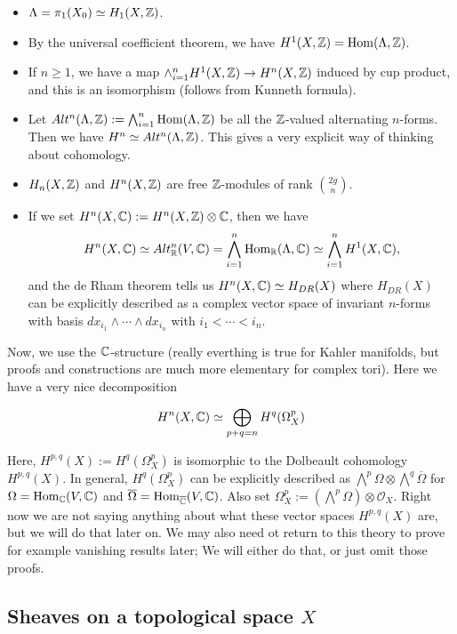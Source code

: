 \begin{itemize}
\item $\Lambda=\pi_1(X_0)\simeq H_1(X,{\mathbb Z})$.
\item By the universal coefficient theorem, we have $H^1(X,{\mathbb Z})=\operatorname{Hom}(\Lambda,{\mathbb Z})$.
\item If $n\geq 1$, we have a map $\wedge_{i=1}^n H^1(X,{\mathbb Z})\to H^n(X,{\mathbb Z})$ induced by cup product, and this is an isomorphism (follows from Kunneth formula). 
\item Let $Alt^n(\Lambda,{\mathbb Z}):=\bigwedge_{i=1}^n \operatorname{Hom}(\Lambda,{\mathbb Z})$ be all the ${\mathbb Z}$-valued alternating $n$-forms. Then we have $H^n\simeq Alt^n(\Lambda,{\mathbb Z})$. This gives a very explicit way of thinking about cohomology.
\item $H_n(X,{\mathbb Z})$ and $H^n(X,{\mathbb Z})$ are free ${\mathbb Z}$-modules of rank $\binom{2g}{n}$.
\item If we set $H^n(X,{\mathbb C}):= H^n(X,{\mathbb Z})\otimes {\mathbb C}$, then we have
$$H^n(X,{\mathbb C})\simeq Alt_{\mathbb R}^n(V,{\mathbb C})=\bigwedge_{i=1}^n\operatorname{Hom}_{\mathbb R}(\Lambda,{\mathbb C})\simeq \bigwedge_{i=1}^n H^1(X,{\mathbb C}),$$ 
and the de Rham theorem tells us 
$H^n(X,{\mathbb C})\simeq H_{DR}(X)$ where $H_{DR}(X)$ can be explicitly described as a complex vector space of invariant $n$-forms with basis $dx_{i_1}\wedge \cdots \wedge dx_{i_n}$ with $i_1<\cdots <i_n$. 
\end{itemize}

Now, we use the ${\mathbb C}$-structure (really everthing is true for Kahler manifolds, but proofs and constructions are much more elementary for complex tori). Here we have a very nice decomposition

$$H^n(X,{\mathbb C})\simeq \bigoplus_{p+q=n} H^q(\Omega_X^p)$$ 

Here, $H^{p,q}(X):=H^q(\Omega_X^p)$ is isomorphic to the Dolbeault cohomology $H^{p,q}(X)$. In general, $H^q(\Omega_X^p)$ can be explicitly described as $\bigwedge^p\Omega \otimes \bigwedge^q\overline{\Omega}$ for $\Omega=\operatorname{Hom}_{\mathbb C}(V,{\mathbb C})$ and $\overline{\Omega}=\operatorname{Hom}_{\overline{{\mathbb C}}}(V,{\mathbb C})$.
Also set $\Omega_X^p:=(\bigwedge^p \Omega)\otimes \mathcal{O}_X$. Right now we are not saying anything about what these vector spaces $H^{p,q}(X)$ are, but we will do that later on. We may also need ot return to this theory to prove for example vanishing results later; We will either do that, or just omit those proofs.

\subsection{Sheaves on a topological space $X$}

